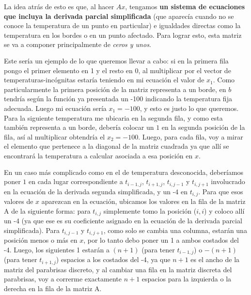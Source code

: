 La idea atrás de esto es que, al hacer $Ax$, tengamos \textbf{un sistema de ecuaciones que incluya la derivada parcial simplificada} (que aparecía cuando no se conoce la temperatura de un punto en particular) e igualdades directas como la temperatura en los bordes o en un punto afectado. Para lograr esto, esta matriz se va a componer principalmente de \textit{ceros y unos}.

\vspace{\baselineskip}

Este sería un ejemplo de lo que queremos llevar a cabo: si en la primera fila pongo el primer elemento en 1 y el resto en 0, al multiplicar por el vector de temperaturas-incógnitas estaría teniendo en mi ecuación el valor de $x_1$. Como particularmente la primera posición de la matriz representa a un borde, en $b$ tendría según la función ya presentada un -100 indicando la temperatura fija adecuada. Luego mi ecuación sería $x_1 = -100$, y esto es justo lo que queremos. Para la siguiente temperatura me ubicaria en la segunda fila, y como esta también representa a un borde, debería colocar un $1$ en la segunda posición de la fila, así al multiplicar obtendría el $x_2 = -100$. Luego, para cada fila, voy a mirar el elemento que pertenece a la diagonal de la matriz cuadrada ya que allí se encontrará la temperatura a calcular asociada a esa posición en $x$.

En un caso más complicado como en el de temperatura desconocida, deberíamos poner $1$ en cada lugar correspondiente a $t_{i-1,j}$, $t_{i+1,j}$, $t_{i,j-1}$ y $t_{i,j+1}$ involucrado en la ecuación de la derivada segunda simplificada, y un -4 en $t_{i,j}$. Para que esos valores de $x$ aparezcan en la ecuación, ubicamos los valores en la fila de la matriz A de la siguiente forma: para $t_{i,j}$ simplemente tomo la posición ($i,i$) y coloco allí un -4 (ya que ese es su coeficiente asignado en la ecuación de la derivada parcial simplificada). Para $t_{i,j-1}$ y $t_{i,j+1}$, como solo se cambia una columna, estarán una posición menos o más en $x$, por lo tanto debo poner un 1 a ambos costados del -4. Luego, los siguientes 1 estarán a $(n+1)$ (para tener $t_{i-1,j}$) o $-(n+1)$ (para tener $t_{i+1,j}$) espacios a los costados del -4, ya que $n+1$ es el ancho de la matriz del parabrisas discreto, y al cambiar una fila en la matriz discreta del parabrisas, voy a correrme exactamente $n+1$ espacios para la izquierda o la derecha en la fila de la matriz A.

\vspace{\baselineskip}

